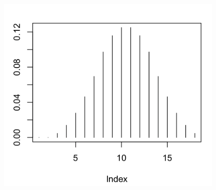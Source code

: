 \documentclass[12pt,a4paper]{article}
\begin{document}
\begin{figure}[h]
  \centering
  \includegraphics[width=.3\textwidth]{noppasumma3.png}
\end{figure}
\end{document}
